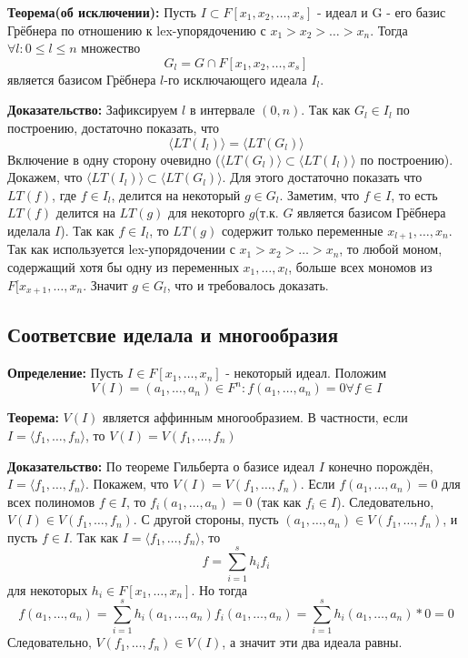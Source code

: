 \documentclass{article}
\begin{document}
    \textbf{Теорема(об исключении):} Пусть $I \subset F[x_1, x_2,\ldots, x_s]$ - идеал и G - его базис Грёбнера по отношению
    к lex-упорядочению с $x_1 > x_2 > \ldots > x_n$. Тогда $\forall l : 0 \leq l \leq n $ множество
    $$G_l = G \cap F[x_1, x_2,\ldots,x_s]$$ является базисом Грёбнера $l$-го исключающего идеала $I_l$.
    
    \textbf{Доказательство:} 
     Зафиксируем $l$ в интервале $(0, n)$. Так как $G_l \in I_l$ по построению, достаточно показать, что 
     $$\langle LT(I_l) \rangle =\langle LT(G_l) \rangle $$ 
     Включение в одну сторону очевидно
     ($\langle LT(G_l) \rangle \subset \langle LT(I_l) \rangle $ по построению). Докажем, что $\langle LT(I_l) \rangle \subset \langle LT(G_l) \rangle $.
     Для этого достаточно показать что $LT(f)$, где $f \in I_l$, делится на некоторый $g \in G_l$. 
     Заметим, что $f \in I$, то есть $LT(f)$ делится на $LT(g)$ для некоторго $g$(т.к. $G$ является базисом Грёбнера иделала $I$). 
     Так как $f \in I_l$, то $LT(g)$ содержит только переменные $x_{l+1}, \ldots, x_n$. Так как используется lex-упорядочении с 
     $x_1 > x_2 > \ldots > x_n$, то любой моном, содержащий хотя бы одну из переменных $x_1, \ldots, x_l$, больше всех мономов из
     $F[x_{x+1},\ldots, x_n$. Значит $g\in G_l$, что и требовалось доказать.
    \newpage

    \subsection{Соответсвие иделала и многообразия}

    \textbf{Определение:} Пусть $I \in F[x_1,\ldots, x_n]$ - некоторый идеал. Положим
    $$V(I) = {(a_1, \ldots, a_n) \in F^n : f(a_1, \ldots, a_n) = 0 \forall f \in I}$$

    \textbf{Теорема:} $V(I)$ является аффинным многообразием. В частности, если $I = \langle f_1, \ldots, f_n \rangle $,
    то $V(I) = V(f_1,\ldots,f_n)$

    \textbf{Доказательство:} По теореме Гильберта о базисе идеал $I$ конечно порождён, $I = \langle f_1, \ldots, f_n \rangle $. Покажем, что $V(I) = V(f_1,\ldots,f_n)$.
    Если $f(a_1,\ldots,a_n) = 0$ для всех полиномов $f \in I$, то $f_i(a_1,\ldots,a_n)=0$ (так как $f_i \in I$). Следовательно,
    $V(I) \in V(f_1,\ldots,f_n)$. С другой стороны, пусть $(a_1,\ldots,a_n) \in V(f_1,\ldots, f_n)$, и пусть $f\in I$.
    Так как $I = \langle f_1,\ldots, f_n \rangle $, то $$f = \sum_{i=1}^s h_if_i$$ для некоторых $h_i \in F[x_1, \ldots, x_n]$.
    Но тогда 
    $$f(a_1,\ldots,a_n)=\sum_{i=1}^s h_i(a_1,\ldots,a_n)f_i(a_1,\ldots,a_n)=\sum_{i=1}^s h_i(a_1,\ldots,a_n)*0 = 0$$
    Следовательно, $V(f_1, \ldots, f_n) \in V(I)$, а значит эти два идеала равны. 
\end{document}
